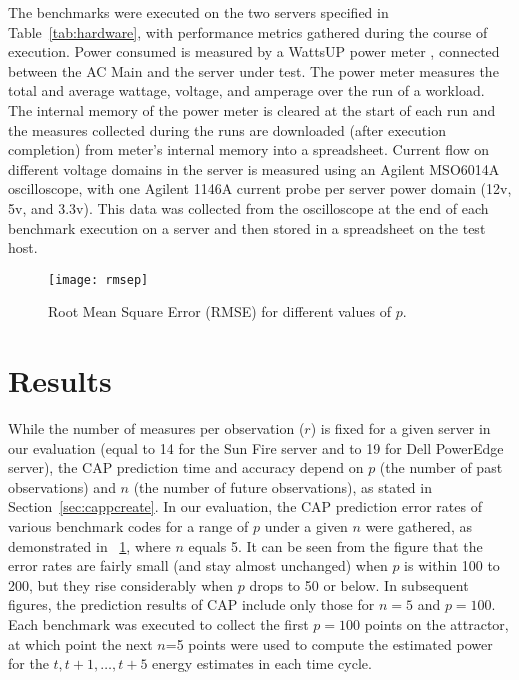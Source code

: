 The benchmarks were executed on the two servers specified in
Table~\ref{tab:hardware}, with performance metrics gathered during the
course of execution.  Power consumed is measured by a WattsUP power meter
\cite{WattsUp2006a}, connected between the AC Main and the server under
test.  The power meter measures the total and average wattage,
voltage, and amperage over the run of a workload.  The internal memory
of the power meter is cleared at the start of each run and the measures
collected during the runs are downloaded (after execution completion)
from meter's internal memory into a spreadsheet.  Current flow on
different voltage domains in the server is measured using an Agilent
MSO6014A oscilloscope, with one Agilent 1146A current probe per server
power domain (12v, 5v, and 3.3v).  This data was collected from the
oscilloscope at the end of each benchmark execution on a server and then
stored in a spreadsheet on the test host.

\begin{figure}[]
  \centering
  \texttt{[image: rmsep]}
  \caption{Root Mean Square Error (RMSE) for different values of $p$.}
  \label{fig:rmsep}
\end{figure}
\section{Results}
\label{sec:htcase}
While the number of measures per observation ($r$) is fixed for a given
server in our evaluation (equal to 14 for the Sun Fire server and to 19
for Dell PowerEdge server), the CAP prediction time and accuracy depend
on $p$ (the number of past observations) and $n$ (the number of future
observations), as stated in Section~\ref{sec:cappcreate}.  In our
evaluation, the CAP prediction error rates of various benchmark codes
for a range of $p$ under a given $n$ were gathered, as demonstrated in
\figurename~\ref{fig:rmsep}, where $n$ equals 5.  It can be seen from
the figure that the error rates are fairly small (and stay almost
unchanged) when $p$ is within 100 to 200, but they rise considerably
when $p$ drops to 50 or below.  In subsequent figures, the prediction
results of CAP include only those for $n = 5$ and $p = 100$.  Each
benchmark was executed to collect the first $p=100$ points on the
attractor, at which point the next $n$=5 points were used to
compute the estimated power for the $t, t+1,\ldots,t+5$ energy estimates
in each time cycle.

